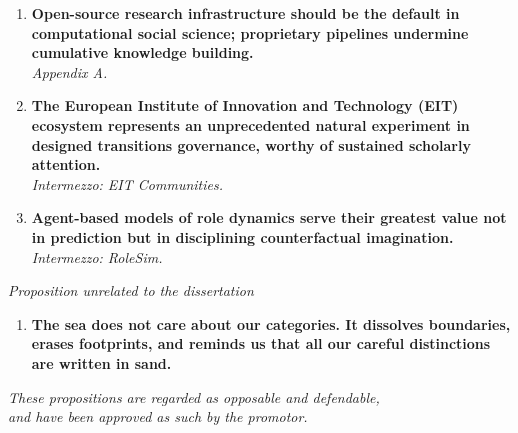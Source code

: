 \documentclass[../main.tex]{subfiles}
\begin{document}
\begin{enumerate}[leftmargin=1.5cm, itemsep=0.8em, label=\textbf{\Roman*.}]
\item \textbf{Open-source research infrastructure should be the default in computational social science; proprietary pipelines undermine cumulative knowledge building.}\\
\textit{Appendix A.}

\item \textbf{The European Institute of Innovation and Technology (EIT) ecosystem represents an unprecedented natural experiment in designed transitions governance, worthy of sustained scholarly attention.}\\
\textit{Intermezzo: EIT Communities.}

\item \textbf{Agent-based models of role dynamics serve their greatest value not in prediction but in disciplining counterfactual imagination.}\\
\textit{Intermezzo: RoleSim.}

\end{enumerate}

\vspace{1.5cm}

\noindent\textit{Proposition unrelated to the dissertation}

\vspace{0.8cm}

\begin{enumerate}[leftmargin=1.5cm, itemsep=0.8em, label=\textbf{\Roman*.}, resume]

\item \textbf{The sea does not care about our categories. It dissolves boundaries, erases footprints, and reminds us that all our careful distinctions are written in sand.}

\end{enumerate}

\vspace{2cm}

\begin{flushright}
\textit{These propositions are regarded as opposable and defendable,}\\
\textit{and have been approved as such by the promotor.}
\end{flushright}
\end{document}
